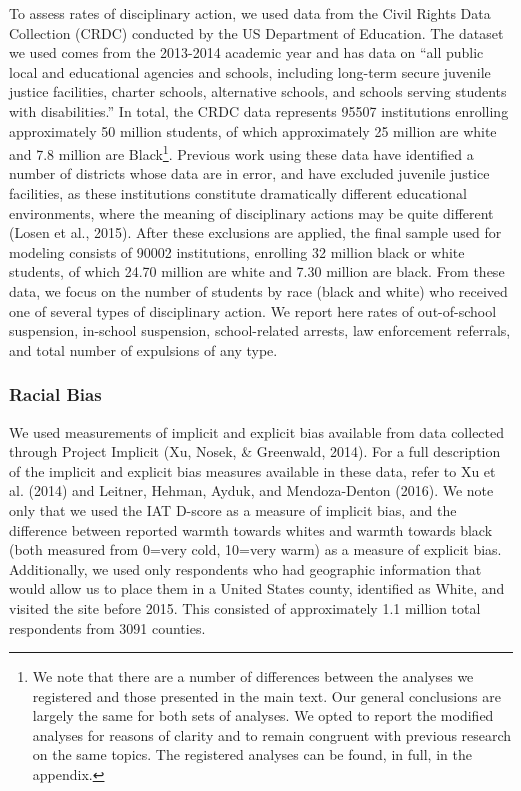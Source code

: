 \documentclass[english,floatsintext,man]{apa6}
\theoremstyle{definition}
\theoremstyle{definition}
\theoremstyle{remark}
\begin{document}
To assess rates of disciplinary action, we used data from the Civil
Rights Data Collection (CRDC) conducted by the US Department of
Education. The dataset we used comes from the 2013-2014 academic year
and has data on \enquote{all public local and educational agencies and
schools, including long-term secure juvenile justice facilities, charter
schools, alternative schools, and schools serving students with
disabilities.} In total, the CRDC data represents 95507 institutions
enrolling approximately 50 million students, of which approximately 25
million are white and 7.8 million are Black\footnote{We note that there
  are a number of differences between the analyses we registered and
  those presented in the main text. Our general conclusions are largely
  the same for both sets of analyses. We opted to report the modified
  analyses for reasons of clarity and to remain congruent with previous
  research on the same topics. The registered analyses can be found, in
  full, in the appendix.}. Previous work using these data have
identified a number of districts whose data are in error, and have
excluded juvenile justice facilities, as these institutions constitute
dramatically different educational environments, where the meaning of
disciplinary actions may be quite different (Losen et al., 2015). After
these exclusions are applied, the final sample used for modeling
consists of 90002 institutions, enrolling 32 million black or white
students, of which 24.70 million are white and 7.30 million are black.
From these data, we focus on the number of students by race (black and
white) who received one of several types of disciplinary action. We
report here rates of out-of-school suspension, in-school suspension,
school-related arrests, law enforcement referrals, and total number of
expulsions of any type.

\subsubsection{Racial Bias}\label{racial-bias}

We used measurements of implicit and explicit bias available from data
collected through Project Implicit (Xu, Nosek, \& Greenwald, 2014). For
a full description of the implicit and explicit bias measures available
in these data, refer to Xu et al. (2014) and Leitner, Hehman, Ayduk, and
Mendoza-Denton (2016). We note only that we used the IAT D-score as a
measure of implicit bias, and the difference between reported warmth
towards whites and warmth towards black (both measured from 0=very cold,
10=very warm) as a measure of explicit bias. Additionally, we used only
respondents who had geographic information that would allow us to place
them in a United States county, identified as White, and visited the
site before 2015. This consisted of approximately 1.1 million total
respondents from 3091 counties.
\end{document}

